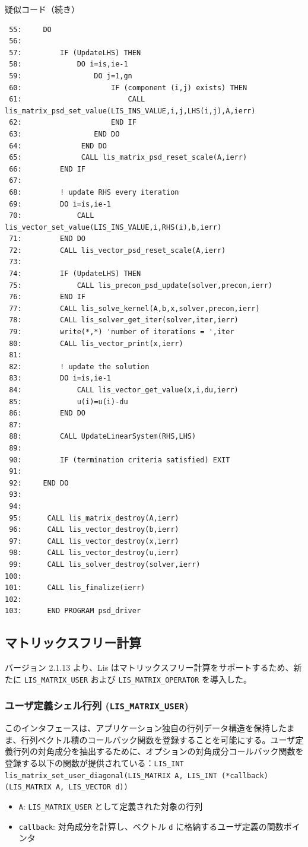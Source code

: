\documentclass[a4paper]{jarticle}
\begin{document}
{{\begin{itembox}[l]{疑似コード（続き）}
{\small
\begin{verbatim}
 55:     DO
 56:
 57:         IF (UpdateLHS) THEN
 58:             DO i=is,ie-1
 59:                 DO j=1,gn
 60:                     IF (component (i,j) exists) THEN
 61:                         CALL lis_matrix_psd_set_value(LIS_INS_VALUE,i,j,LHS(i,j),A,ierr)
 62:                     END IF
 63:                 END DO
 64:              END DO
 65:              CALL lis_matrix_psd_reset_scale(A,ierr)
 66:         END IF
 67:
 68:         ! update RHS every iteration
 69:         DO i=is,ie-1
 70:             CALL lis_vector_set_value(LIS_INS_VALUE,i,RHS(i),b,ierr)
 71:         END DO
 72:         CALL lis_vector_psd_reset_scale(A,ierr)
 73:
 74:         IF (UpdateLHS) THEN
 75:             CALL lis_precon_psd_update(solver,precon,ierr)
 76:         END IF
 77:         CALL lis_solve_kernel(A,b,x,solver,precon,ierr)
 78:         CALL lis_solver_get_iter(solver,iter,ierr)
 79:         write(*,*) 'number of iterations = ',iter
 80:         CALL lis_vector_print(x,ierr)
 81:
 82:         ! update the solution
 83:         DO i=is,ie-1
 84:             CALL lis_vector_get_value(x,i,du,ierr)
 85:             u(i)=u(i)-du
 86:         END DO
 87:
 88:         CALL UpdateLinearSystem(RHS,LHS)
 89:
 90:         IF (termination criteria satisfied) EXIT
 91:
 92:     END DO
 93:
 94:
 95:      CALL lis_matrix_destroy(A,ierr)
 96:      CALL lis_vector_destroy(b,ierr)
 97:      CALL lis_vector_destroy(x,ierr)
 98:      CALL lis_vector_destroy(u,ierr)
 99:      CALL lis_solver_destroy(solver,ierr)
100:
101:      CALL lis_finalize(ierr)
102:
103:      END PROGRAM psd_driver
\end{verbatim}
}
\end{itembox}

\newpage
\subsection{マトリックスフリー計算}
バージョン 2.1.13 より、Lis はマトリックスフリー計算をサポートするため、新たに \texttt{LIS\_MATRIX\_USER} および \texttt{LIS\_MATRIX\_OPERATOR} を導入した。

\subsubsection{ユーザ定義シェル行列 (\texttt{LIS\_MATRIX\_USER})}
このインタフェースは、アプリケーション独自の行列データ構造を保持したまま、行列ベクトル積のコールバック関数を登録することを可能にする。ユーザ定義行列の対角成分を抽出するために、オプションの対角成分コールバック関数を登録する以下の関数が提供されている：\noindent\texttt{LIS\_INT lis\_matrix\_set\_user\_diagonal(LIS\_MATRIX A, LIS\_INT (*callback)(LIS\_MATRIX A, LIS\_VECTOR d))}
\begin{itemize}
\item \texttt{A}: \texttt{LIS\_MATRIX\_USER} として定義された対象の行列
\item \texttt{callback}: 対角成分を計算し、ベクトル \texttt{d} に格納するユーザ定義の関数ポインタ
\end{itemize}

}}
\end{document}
